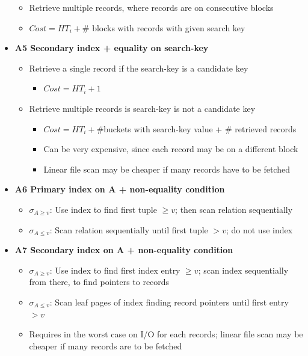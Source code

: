 \begin{itemize}[label=\(\rhd\)]
\begin{itemize}[label=\(\rhd\)]
        \item Retrieve multiple records, where records are on consecutive blocks
        \item $Cost=HT_i+ \# $ blocks with records with given search key
    \end{itemize}
    \item \textbf{A5 Secondary index + equality on search-key} 
    \begin{itemize}[label=\(\rhd\)]
        \item Retrieve a single record if the search-key is a candidate key
        \begin{itemize}[label=\(\rhd\)]
            \item $Cost=HT_i+1$
        \end{itemize}
        \item Retrieve multiple records is search-key is not a candidate key
        \begin{itemize}[label=\(\rhd\)]
            \item $Cost = HT_i + \#$buckets with search-key value + $\#$ retrieved records
            \item Can be very expensive, since each record may be on a different block
            \item Linear file scan may be cheaper if many records have to be fetched
        \end{itemize}
    \end{itemize}
    \item \textbf{A6 Primary index on A + non-equality condition}
    \begin{itemize}[label=\(\rhd\)]
        \item $\sigma_{A\geq v}$: Use index to find first tuple $\geq v$; then scan relation sequentially
        \item $\sigma_{A\leq v}$: Scan relation sequentially until first tuple $>v$; do not use index
    \end{itemize}
    \item \textbf{A7 Secondary index on A + non-equality condition}
    \begin{itemize}[label=\(\rhd\)]
        \item $\sigma_{A\geq v}$: Use index to find first index entry $\geq v$; scan index sequentially from there, to find pointers to records
        \item $\sigma_{A\leq v}$: Scan leaf pages of index finding record pointers until first entry $>v$
        \item Requires in the worst case on I/O for each records; linear file scan may be cheaper if many records are to be fetched
    \end{itemize}
\end{itemize}

